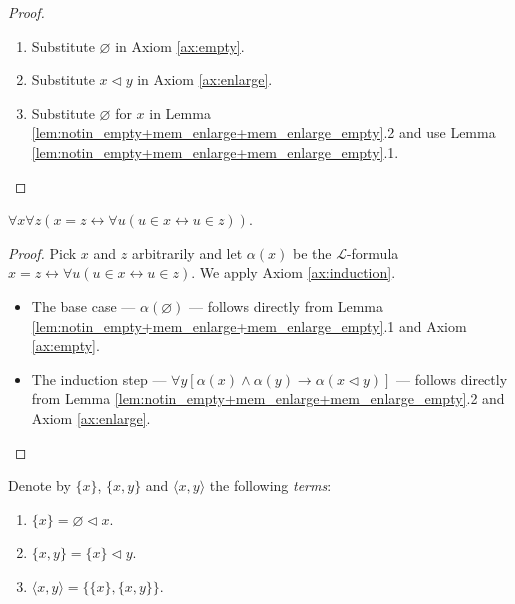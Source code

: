 \begin{proof}
    \leanok
    \leavevmode
    \begin{enumerate}
        \item Substitute $\varnothing$ in Axiom \ref{ax:empty}.
        \item Substitute $x \lhd y$ in Axiom \ref{ax:enlarge}.
        \item Substitute $\varnothing$ for $x$ in Lemma 
        \ref{lem:notin_empty+mem_enlarge+mem_enlarge_empty}.2 and use Lemma 
        \ref{lem:notin_empty+mem_enlarge+mem_enlarge_empty}.1.
    \end{enumerate}
\end{proof}

\begin{theorem}
    \label{thm:exten_prop}
    \leanok
    $\forall x \forall z (x=z \leftrightarrow \forall u (u \in x \leftrightarrow u \in z))$.
\end{theorem}

\begin{proof}
    \leanok
    Pick $x$ and $z$ arbitrarily and let $\alpha (x)$ be the $\mathcal{L}$-formula
    $x=z \leftrightarrow \forall u (u \in x \leftrightarrow u \in z)$.
    We apply Axiom \ref{ax:induction}.
    \begin{itemize}
        \item The base case — $\alpha (\varnothing)$ — follows directly from Lemma 
        \ref{lem:notin_empty+mem_enlarge+mem_enlarge_empty}.1 and Axiom \ref{ax:empty}.
        \item The induction step — 
        $\forall y[\alpha(x) \land \alpha(y) \rightarrow \alpha(x \lhd y)]$ — 
        follows directly from Lemma \ref{lem:notin_empty+mem_enlarge+mem_enlarge_empty}.2 and 
        Axiom \ref{ax:enlarge}.
    \end{itemize}
\end{proof}

\begin{definition}
    \label{def:singleton+pair}
    \leanok
    Denote by $\{x\}$, $\{x,y\}$ and $\langle x,y\rangle$ the following \textit{terms}:
    \begin{enumerate}
        \item $\{x\} = \varnothing \lhd x$.
        \item $\{x,y\} = \{x\} \lhd y$.
        \item $\langle x,y\rangle = \{\{x\}, \{x,y\}\}$.
    \end{enumerate}
\end{definition}

